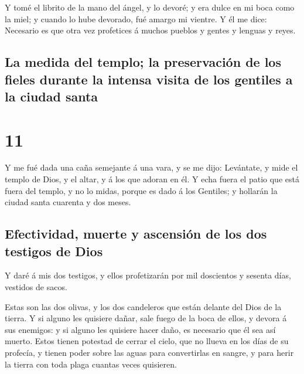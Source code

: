  Y tomé el librito de la mano del ángel, y lo devoré; y
era dulce en mi boca como la miel; y cuando lo hube devorado, fué amargo
mi vientre.  Y él me dice: Necesario es que otra vez
profetices á muchos pueblos y gentes y lenguas y reyes.

\hypertarget{la-medida-del-templo-la-preservaciuxf3n-de-los-fieles-durante-la-intensa-visita-de-los-gentiles-a-la-ciudad-santa}{%
\subsection{La medida del templo; la preservación de los fieles durante
la intensa visita de los gentiles a la ciudad
santa}\label{la-medida-del-templo-la-preservaciuxf3n-de-los-fieles-durante-la-intensa-visita-de-los-gentiles-a-la-ciudad-santa}}

\hypertarget{section-66-11}{%
\section{11}\label{section-66-11}}

 Y me fué dada una caña semejante á una vara, y se me
dijo: Levántate, y mide el templo de Dios, y el altar, y á los que
adoran en él.  Y echa fuera el patio que está fuera del
templo, y no lo midas, porque es dado á los Gentiles; y hollarán la
ciudad santa cuarenta y dos meses.

\hypertarget{efectividad-muerte-y-ascensiuxf3n-de-los-dos-testigos-de-dios}{%
\subsection{Efectividad, muerte y ascensión de los dos testigos de
Dios}\label{efectividad-muerte-y-ascensiuxf3n-de-los-dos-testigos-de-dios}}

 Y daré á mis dos testigos, y ellos profetizarán por mil
doscientos y sesenta días, vestidos de sacos.

 Estas son las dos olivas, y los dos candeleros que están
delante del Dios de la tierra.  Y si alguno les quisiere
dañar, sale fuego de la boca de ellos, y devora á sus enemigos: y si
alguno les quisiere hacer daño, es necesario que él sea así muerto.
 Estos tienen potestad de cerrar el cielo, que no llueva
en los días de su profecía, y tienen poder sobre las aguas para
convertirlas en sangre, y para herir la tierra con toda plaga cuantas
veces quisieren.

